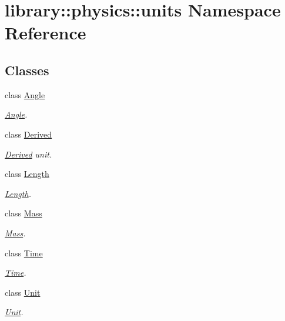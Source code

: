 \hypertarget{namespacelibrary_1_1physics_1_1units}{}\section{library\+:\+:physics\+:\+:units Namespace Reference}
\label{namespacelibrary_1_1physics_1_1units}
\subsection*{Classes}
\begin{DoxyCompactItemize}
\item 
class \hyperlink{classlibrary_1_1physics_1_1units_1_1_angle}{Angle}
\begin{DoxyCompactList}\small\item\em \hyperlink{classlibrary_1_1physics_1_1units_1_1_angle}{Angle}. \end{DoxyCompactList}\item 
class \hyperlink{classlibrary_1_1physics_1_1units_1_1_derived}{Derived}
\begin{DoxyCompactList}\small\item\em \hyperlink{classlibrary_1_1physics_1_1units_1_1_derived}{Derived} unit. \end{DoxyCompactList}\item 
class \hyperlink{classlibrary_1_1physics_1_1units_1_1_length}{Length}
\begin{DoxyCompactList}\small\item\em \hyperlink{classlibrary_1_1physics_1_1units_1_1_length}{Length}. \end{DoxyCompactList}\item 
class \hyperlink{classlibrary_1_1physics_1_1units_1_1_mass}{Mass}
\begin{DoxyCompactList}\small\item\em \hyperlink{classlibrary_1_1physics_1_1units_1_1_mass}{Mass}. \end{DoxyCompactList}\item 
class \hyperlink{classlibrary_1_1physics_1_1units_1_1_time}{Time}
\begin{DoxyCompactList}\small\item\em \hyperlink{classlibrary_1_1physics_1_1units_1_1_time}{Time}. \end{DoxyCompactList}\item 
class \hyperlink{classlibrary_1_1physics_1_1units_1_1_unit}{Unit}
\begin{DoxyCompactList}\small\item\em \hyperlink{classlibrary_1_1physics_1_1units_1_1_unit}{Unit}. \end{DoxyCompactList}\end{DoxyCompactItemize}
